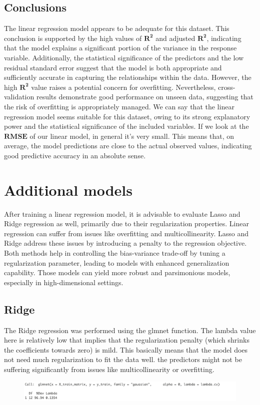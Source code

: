 \documentclass{article}
\begin{document}
\subsection{Conclusions}
The linear regression model appears to be adequate for this dataset.
This conclusion is supported by the high values of $\mathbf{R^2}$ and adjusted $\mathbf{R^2}$, indicating that the model explains a significant portion of the variance in the response variable.
Additionally, the statistical significance of the predictors and the low residual standard error suggest that the model is both appropriate and sufficiently accurate in capturing the relationships within the data. 
However, the high $\mathbf{R^2}$ value raises a potential concern for overfitting. Nevertheless, cross-validation results demonstrate good performance on unseen data, suggesting that the risk of overfitting is appropriately managed. We can say that the linear regression model seems suitable for this dataset, owing to its strong explanatory power and the statistical significance of the included variables.
If we look at the $\mathbf{RMSE}$ of our linear model, in general it's very small. This means that, on average, the model predictions are close to the actual observed values, indicating good predictive accuracy in an absolute sense.
\newpage
\section{Additional models}
After training a linear regression model, it is advisable to evaluate Lasso and Ridge regression as well, primarily due to their regularization properties. Linear regression can suffer from issues like overfitting and multicollinearity. Lasso and Ridge address these issues by introducing a penalty to the regression objective. Both methods help in controlling the bias-variance trade-off by tuning a regularization parameter, leading to models with enhanced generalization capability. Those models can yield more robust and parsimonious models, especially in high-dimensional settings.
\subsection{Ridge}
The Ridge regression was performed using the glmnet function. The lambda value here is relatively low that implies that the regularization penalty (which shrinks the coefficients towards zero) is mild.
This basically means that the model does not need much regularization to fit the data well. the predictors might not be suffering significantly from issues like multicollinearity or overfitting.
\begin{figure}[H]
   \centering
   \includegraphics[width=\linewidth]{images/ridge.png}
   \label{fig:fig21}
\end{figure}
\end{document}
